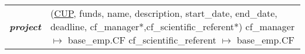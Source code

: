 \begin{tabular}{@{}l l@{}}
	\textbf{\textit{project}}            & \makecell[lt]{
	(\underline{CUP}, funds, name, description, start\_date, end\_date,                                                                                \\
	\qquad deadline, cf\_manager*,cf\_scientific\_referent*)  \smallskip                                                                               \\
	cf\_manager $\mapsto$ base\_emp.CF                                                                                                                 \\
		cf\_scientific\_referent $\mapsto$ base\_emp.CF}\medskip
\end{tabular}


